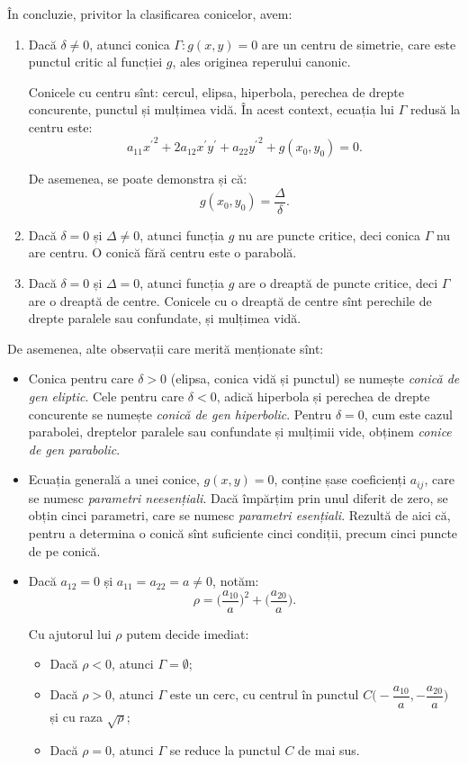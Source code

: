 În concluzie, privitor la clasificarea conicelor, avem:
\begin{enumerate}[(1)]
	\item Dacă $\delta \neq 0$, atunci conica $\Gamma : g(x,y) = 0$ are un
centru de simetrie, care este punctul critic al funcției $g$, ales originea
reperului canonic. 

Conicele cu centru sînt: cercul, elipsa, hiperbola, perechea de drepte 
concurente, punctul și mulțimea vidă. În acest context, ecuația lui $\Gamma$ 
redusă la centru este: 
 \[
	a_{11} {x^{\prime}}^2 + 2a_{12} x^{\prime} y^{\prime} + 
	a_{22} {y^{\prime}}^2 + g(x_0, y_0) = 0.
\]

De asemenea, se poate demonstra și că: 
 \[
	g(x_0, y_0) = \dfrac{\Delta}{\delta}.
\]

    \item Dacă $\delta = 0$ și $\Delta \neq 0$, atunci funcția $g$ nu are puncte
critice, deci conica $\Gamma$ nu are centru. O conică fără centru este o 
parabolă.

    \item Dacă $\delta = 0$ și $\Delta = 0$, atunci funcția $g$ are o dreaptă
de puncte critice, deci $\Gamma$ are o dreaptă de centre. Conicele cu o dreaptă
de centre sînt perechile de drepte paralele sau confundate, și mulțimea vidă.
\end{enumerate}

De asemenea, alte observații care merită menționate sînt:
\begin{itemize}
	\item Conica pentru care $\delta > 0$ (elipsa, conica vidă și punctul) se 
numește \emph{conică de gen eliptic}. Cele pentru care $\delta < 0$, adică
hiperbola și perechea de drepte concurente se numește \emph{conică de gen
hiperbolic}. Pentru $\delta = 0$, cum este cazul parabolei, dreptelor paralele
sau confundate și mulțimii vide, obținem \emph{conice de gen parabolic}.

    \item Ecuația generală a unei conice, $g(x,y) = 0$, conține șase 
coeficienți $a_{ij}$, care se numesc \emph{parametri neesențiali}. Dacă împărțim
prin unul diferit de zero, se obțin cinci parametri, care se numesc 
\emph{parametri esențiali}. Rezultă de aici că, pentru a determina o conică sînt
suficiente cinci condiții, precum cinci puncte de pe conică.

    \item Dacă $a_{12} = 0$ și $a_{11} = a_{22} = a \neq 0$, notăm: 
 \[
	\rho = \Big( \dfrac{a_{10}}{a} \Big)^2 + \Big( \dfrac{a_{20}}{a} \Big).
\]

Cu ajutorul lui $\rho$ putem decide imediat:
\begin{itemize}
	\item Dacă $\rho < 0$, atunci $\Gamma = \emptyset$;
	\item Dacă $\rho > 0$, atunci $\Gamma$ este un cerc, cu centrul în punctul
$C \Big( -\dfrac{a_{10}}{a}, -\dfrac{a_{20}}{a} \Big)$ și cu raza $\sqrt{\rho}$;
    \item Dacă $\rho = 0$, atunci $\Gamma$ se reduce la punctul $C$ de mai sus.
\end{itemize}
\end{itemize}

